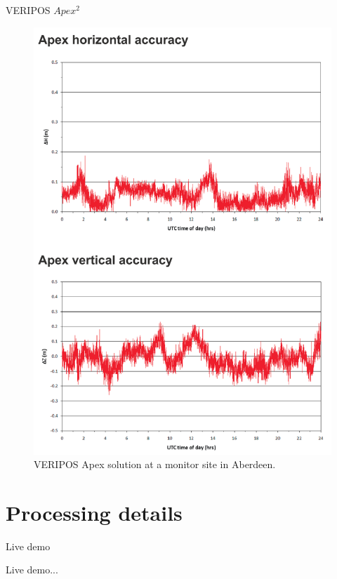 \documentclass[12pt]{beamer}
\begin{document}
\begin{frame}[plain]{VERIPOS  $Apex^2$}
	
	\begin{figure}
		
		\includegraphics[height=0.8\textheight]{pic/Apex.png}
		\caption{VERIPOS Apex solution at a monitor site in Aberdeen.}
	\end{figure}
	
\end{frame}






\section{Processing details}

\begin{frame}{Live demo}
	
Live demo...
	
	
	
\end{frame}
\end{document}
